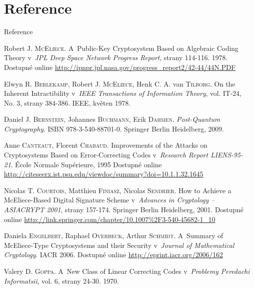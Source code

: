 \documentclass{beamer}
\begin{document}
\section{Reference}
\begin{frame}[allowframebreaks]{Reference}
    \begin{thebibliography}{99}

        Robert J. \textsc{McEliece}. A~Public-Key Cryptosystem Based on
        Algebraic Coding Theory v~\emph{JPL Deep Space Network Progress Report},
        strany 114-116. 1978. Dostupné online
        \url{http://ipnpr.jpl.nasa.gov/progress_report2/42-44/44N.PDF}

        Elwyn R. \textsc{Berlekamp}, Robert J. \textsc{McEliece}, Henk C. A. van
        \textsc{Tilborg}.  On the Inherent Intractibility v~\emph{IEEE
        Transactions of Information Theory}, vol. IT-24, No. 3, strany 384-386.
        IEEE, květen 1978.

        Daniel J. \textsc{Bernstein}, Johannes \textsc{Buchmann}, Erik
        \textsc{Dahmen}. \emph{Post-Quantum Cryptography}. ISBN
        978-3-540-88701-0.  Springer Berlin Heidelberg, 2009.

        Anne \textsc{Canteaut}, Florent \textsc{Chabaud}. Improvements of
        the Attacks on Cryptosystems Based on Error-Correcting Codes
        v~\emph{Research Report LIENS-95-21}. École Normale Supérieure, 1995
        Dostupné online
        \url{http://citeseerx.ist.psu.edu/viewdoc/summary?doi=10.1.1.32.1645}

        Nicolas T. \textsc{Courtois}, Matthieu \textsc{Finiasz}, Nicolas
        \textsc{Sendrier}. How to Achieve a McEliece-Based Digital Signature
        Scheme v~\emph{Advances in Cryptology -- ASIACRYPT 2001}, strany
        157-174. Springer Berlin Heidelberg, 2001. Dostupné online
        \url{http://link.springer.com/chapter/10.1007\%2F3-540-45682-1\_10}

        Daniela \textsc{Engelbert}, Raphael \textsc{Overbeck}, Arthur
        \textsc{Schmidt}. A~Summary of McEliece-Type Cryptosystems and their
        Security v~\emph{Journal of Mathematical Cryptology}. IACR 2006.
        Dostupné online \url{http://eprint.iacr.org/2006/162}

        Valery D. \textsc{Goppa}. A~New Class of Linear Correcting Codes
        v~\emph{Problemy Peredachi Informatsii}, vol. 6, strany 24-30. 1970.


\end{thebibliography}
\end{frame}
\end{document}
